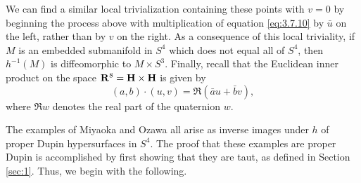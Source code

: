 \documentclass[12pt]{article}
\begin{document}
We can find a similar local trivialization containing these points
with $v=0$ by beginning the process above with multiplication of equation \eqref{eq:3.7.10} by $\bar{u}$ on the left,
rather than by $v$ on the right.  As a consequence of this local triviality, if $M$ is an embedded submanifold
in $S^4$ which does not equal all of $S^4$, then $h^{-1}(M)$ is diffeomorphic to $M \times S^3$.  Finally, recall
that the Euclidean inner product on the space ${\bf R}^8 = {\bf H} \times {\bf H}$ is given by
\begin{equation} 
\label{eq:3.7.14}
(a,b)\cdot (u,v) = \Re (\bar{a} u + \bar{b} v),
\end{equation}
where $\Re w$ denotes the real part of the quaternion $w$.

The examples of Miyaoka and Ozawa all arise as inverse images under $h$ of 
proper Dupin hypersurfaces 
in $S^4$.  The
proof that these examples are proper Dupin is accomplished by first showing that they are 
taut, as defined in Section \ref{sec:1}. 
Thus, we begin with the following.
\end{document}
